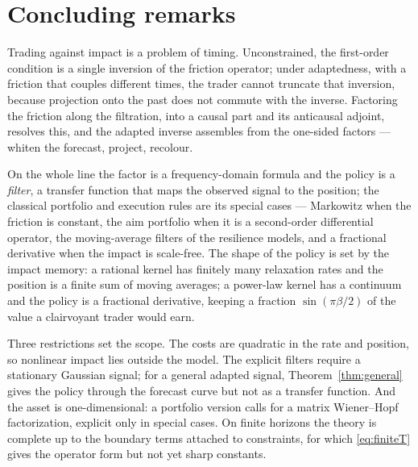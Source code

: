 \documentclass[11pt]{article}
\theoremstyle{plain}
\theoremstyle{definition}
\theoremstyle{remark}
\begin{document}
\section{Concluding remarks}\label{sec:conclusion}

Trading against impact is a problem of timing. Unconstrained, the first-order condition is a single inversion of the friction operator; under adaptedness, with a friction that couples different times, the trader cannot truncate that inversion, because projection onto the past does not commute with the inverse. Factoring the friction along the filtration, into a causal part and its anticausal adjoint, resolves this, and the adapted inverse assembles from the one-sided factors --- whiten the forecast, project, recolour.

On the whole line the factor is a frequency-domain formula and the policy is a \emph{filter}, a transfer function that maps the observed signal to the position; the classical portfolio and execution rules are its special cases --- Markowitz when the friction is constant, the aim portfolio when it is a second-order differential operator, the moving-average filters of the resilience models, and a fractional derivative when the impact is scale-free. The shape of the policy is set by the impact memory: a rational kernel has finitely many relaxation rates and the position is a finite sum of moving averages; a power-law kernel has a continuum and the policy is a fractional derivative, keeping a fraction $\sin(\pi\beta/2)$ of the value a clairvoyant trader would earn.

Three restrictions set the scope. The costs are quadratic in the rate and position, so nonlinear impact lies outside the model. The explicit filters require a stationary Gaussian signal; for a general adapted signal, Theorem~\ref{thm:general} gives the policy through the forecast curve but not as a transfer function. And the asset is one-dimensional: a portfolio version calls for a matrix Wiener--Hopf factorization, explicit only in special cases. On finite horizons the theory is complete up to the boundary terms attached to constraints, for which \eqref{eq:finiteT} gives the operator form but not yet sharp constants.

\appendix
\end{document}
